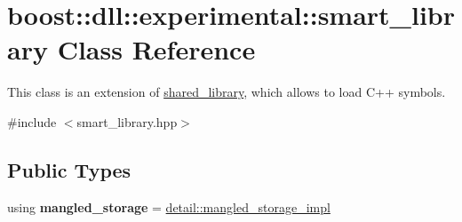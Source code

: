 \hypertarget{a01712}{}\section{boost\+:\+:dll\+:\+:experimental\+:\+:smart\+\_\+library Class Reference}
\label{a01712}


This class is an extension of \hyperlink{a01708}{shared\+\_\+library}, which allows to load C++ symbols.  




{\ttfamily \#include $<$smart\+\_\+library.\+hpp$>$}

\subsection*{Public Types}
\begin{DoxyCompactItemize}
\item 
\mbox{\label{a01712_a65625089fb4e558286ca48bdab2d8511}} 
using {\bfseries mangled\+\_\+storage} = \hyperlink{a01364}{detail\+::mangled\+\_\+storage\+\_\+impl}
\end{DoxyCompactItemize}

